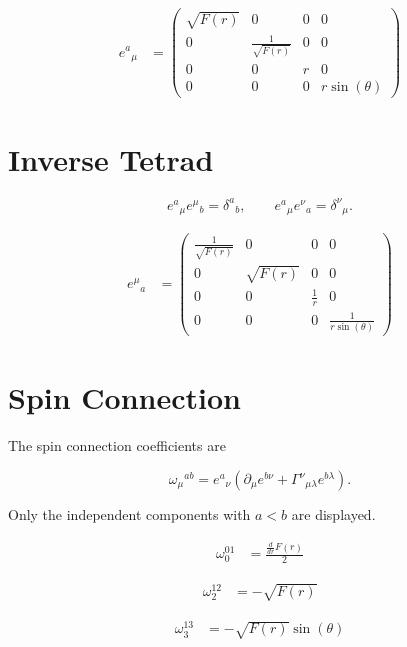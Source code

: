 \documentclass[12pt,fleqn]{article}
\begin{document}
\[
\begin{aligned}
e^a{}_\mu &=
\begin{pmatrix}
\sqrt{F{\left(r \right)}} & 0 & 0 & 0 \\
0 & \frac{1}{\sqrt{F{\left(r \right)}}} & 0 & 0 \\
0 & 0 & r & 0 \\
0 & 0 & 0 & r \sin{\left(\theta \right)}
\end{pmatrix}
\end{aligned}
\]

\section*{Inverse Tetrad}

\[
e^a{}_\mu e^\mu{}_b
=
\delta^a{}_b ,
\qquad
e^a{}_\mu e^\nu{}_a
=
\delta^\nu{}_\mu .
\]

\[
\begin{aligned}
e^\mu{}_a &=
\begin{pmatrix}
\frac{1}{\sqrt{F{\left(r \right)}}} & 0 & 0 & 0 \\
0 & \sqrt{F{\left(r \right)}} & 0 & 0 \\
0 & 0 & \frac{1}{r} & 0 \\
0 & 0 & 0 & \frac{1}{r \sin{\left(\theta \right)}}
\end{pmatrix}
\end{aligned}
\]

\section*{Spin Connection}

The spin connection coefficients are

\[
\omega_\mu{}^{ab}
=
e^a{}_\nu
\left(
\partial_\mu e^{b\nu}
+
\Gamma^\nu{}_{\mu\lambda}
e^{b\lambda}
\right).
\]

Only the independent components with \(a<b\) are displayed.

\[
\begin{aligned}
\omega_{0}^{01} &= \frac{\frac{d}{d r} F{\left(r \right)}}{2}
\end{aligned}
\]

\[
\begin{aligned}
\omega_{2}^{12} &= - \sqrt{F{\left(r \right)}}
\end{aligned}
\]

\[
\begin{aligned}
\omega_{3}^{13} &= - \sqrt{F{\left(r \right)}} \sin{\left(\theta \right)}
\end{aligned}
\]
\end{document}
